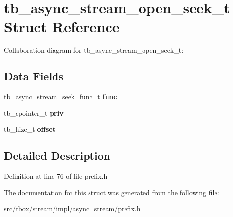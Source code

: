 \hypertarget{structtb__async__stream__open__seek__t}{\section{tb\-\_\-async\-\_\-stream\-\_\-open\-\_\-seek\-\_\-t Struct Reference}
\label{structtb__async__stream__open__seek__t}
}


Collaboration diagram for tb\-\_\-async\-\_\-stream\-\_\-open\-\_\-seek\-\_\-t\-:
\subsection*{Data Fields}
\begin{DoxyCompactItemize}
\item 
\hypertarget{structtb__async__stream__open__seek__t_aa84c4bcbd1cb0e045416e990c883873b}{\hyperlink{async__stream_8h_a3c6ab6b8e797a0bab6f9f150087ef39b}{tb\-\_\-async\-\_\-stream\-\_\-seek\-\_\-func\-\_\-t} {\bfseries func}}\label{structtb__async__stream__open__seek__t_aa84c4bcbd1cb0e045416e990c883873b}

\item 
\hypertarget{structtb__async__stream__open__seek__t_ada8730a15664381e47f4eca3e7dd22f3}{tb\-\_\-cpointer\-\_\-t {\bfseries priv}}\label{structtb__async__stream__open__seek__t_ada8730a15664381e47f4eca3e7dd22f3}

\item 
\hypertarget{structtb__async__stream__open__seek__t_a8a0bd4f3e3b348c9902bda794103059f}{tb\-\_\-hize\-\_\-t {\bfseries offset}}\label{structtb__async__stream__open__seek__t_a8a0bd4f3e3b348c9902bda794103059f}

\end{DoxyCompactItemize}


\subsection{Detailed Description}


Definition at line 76 of file prefix.\-h.



The documentation for this struct was generated from the following file\-:\begin{DoxyCompactItemize}
\item 
src/tbox/stream/impl/async\-\_\-stream/prefix.\-h\end{DoxyCompactItemize}
